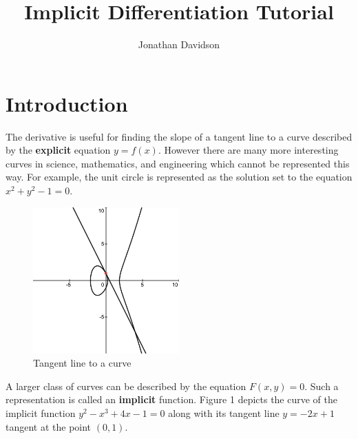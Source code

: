 \documentclass[12pt, letterpaper]{article}
\title{Implicit Differentiation Tutorial}
\author{Jonathan Davidson}
\date{}
\begin{document}
\maketitle

\section{Introduction}
The derivative is useful for finding the slope of a tangent line to a curve described by the \textbf{explicit} equation $y=f(x)$. However there are many more interesting curves in science, mathematics, and engineering which cannot be represented this way. For example, the unit circle is represented as the solution set to the equation $x^2+y^2 -1 = 0$. 

\begin{figure}[h]
	\centering
	\includegraphics[width=0.5\textwidth]{fig1}
	\caption{Tangent line to a curve}
\end{figure}

A larger class of curves can be described by the equation $F(x,y) = 0$. Such a representation is called an \textbf{implicit} function. Figure 1 depicts the curve of the implicit function $y^2-x^3+4x-1 = 0$ along with its tangent line $y = -2x+1$ tangent at the point $(0,1)$.
\end{document}
